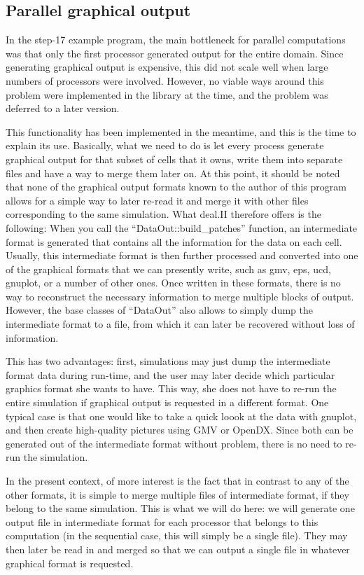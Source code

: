 \documentclass{article}
\begin{document}
\subsection*{Parallel graphical output}

In the step-17 example program, the main bottleneck for parallel computations
was that only the first processor generated output for the entire domain.
Since generating graphical output is expensive, this did not scale well when
large numbers of processors were involved. However, no viable ways around this
problem were implemented in the library at the time, and the problem was
deferred to a later version.

This functionality has been implemented in the meantime, and this is the time
to explain its use. Basically, what we need to do is let every process
generate graphical output for that subset of cells that it owns, write them
into separate files and have a way to merge them later on. At this point, it
should be noted that none of the graphical output formats known to the author
of this program allows for a simple way to later re-read it and merge it with
other files corresponding to the same simulation. What deal.II therefore
offers is the following: When you call the ``DataOut::build\_patches''
function, an intermediate format is generated that contains all the
information for the data on each cell. Usually, this intermediate format is
then further processed and converted into one of the graphical formats that we
can presently write, such as gmv, eps, ucd, gnuplot, or a number of other
ones. Once written in these formats, there is no way to reconstruct the
necessary information to merge multiple blocks of output. However, the base
classes of ``DataOut'' also allows to simply dump the intermediate format to a
file, from which it can later be recovered without loss of information.

This has two advantages: first, simulations may just dump the intermediate
format data during run-time, and the user may later decide which particular
graphics format she wants to have. This way, she does not have to re-run the
entire simulation if graphical output is requested in a different format. One
typical case is that one would like to take a quick loook at the data with
gnuplot, and then create high-quality pictures using GMV or OpenDX. Since both
can be generated out of the intermediate format without problem, there is no
need to re-run the simulation.

In the present context, of more interest is the fact that in contrast to any
of the other formats, it is simple to merge multiple files of intermediate
format, if they belong to the same simulation. This is what we will do here:
we will generate one output file in intermediate format for each processor
that belongs to this computation (in the sequential case, this will simply be
a single file). They may then later be read in and merged so that we can
output a single file in whatever graphical format is requested.
\end{document}
